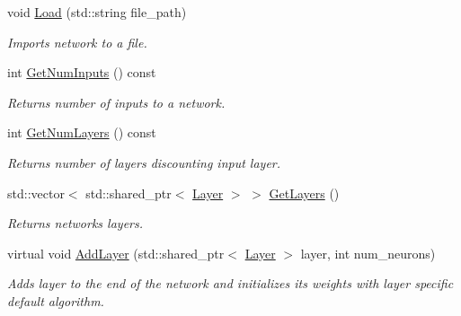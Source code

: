 \begin{DoxyCompactItemize}
\mbox{\label{classneuralnet_1_1Net_a1b973c09cf9e8ec516d03f81eb14b415}} 
void \hyperlink{classneuralnet_1_1Net_a1b973c09cf9e8ec516d03f81eb14b415}{Load} (std\+::string file\+\_\+path)
\begin{DoxyCompactList}\small\item\em Imports network to a file. \end{DoxyCompactList}\item 
\mbox{\label{classneuralnet_1_1Net_ad3c10cfac5fdcec2875d124e22cc04a3}} 
int \hyperlink{classneuralnet_1_1Net_ad3c10cfac5fdcec2875d124e22cc04a3}{Get\+Num\+Inputs} () const
\begin{DoxyCompactList}\small\item\em Returns number of inputs to a network. \end{DoxyCompactList}\item 
\mbox{\label{classneuralnet_1_1Net_a1b75a3924917dc61febb4ec6d24cf770}} 
int \hyperlink{classneuralnet_1_1Net_a1b75a3924917dc61febb4ec6d24cf770}{Get\+Num\+Layers} () const
\begin{DoxyCompactList}\small\item\em Returns number of layer\textquotesingle{}s discounting input layer. \end{DoxyCompactList}\item 
\mbox{\label{classneuralnet_1_1Net_ae34f89c48ac47af9753360b5de77bdc7}} 
std\+::vector$<$ std\+::shared\+\_\+ptr$<$ \hyperlink{classneuralnet_1_1Layer}{Layer} $>$ $>$ \hyperlink{classneuralnet_1_1Net_ae34f89c48ac47af9753360b5de77bdc7}{Get\+Layers} ()
\begin{DoxyCompactList}\small\item\em Returns network\textquotesingle{}s layers. \end{DoxyCompactList}\item 
virtual void \hyperlink{classneuralnet_1_1Net_a71e15d9dbe5a60eb35fcceb7c5c93624}{Add\+Layer} (std\+::shared\+\_\+ptr$<$ \hyperlink{classneuralnet_1_1Layer}{Layer} $>$ layer, int num\+\_\+neurons)
\begin{DoxyCompactList}\small\item\em Adds layer to the end of the network and initializes its weights with layer specific default algorithm. \end{DoxyCompactList}\item 

\end{DoxyCompactItemize}
